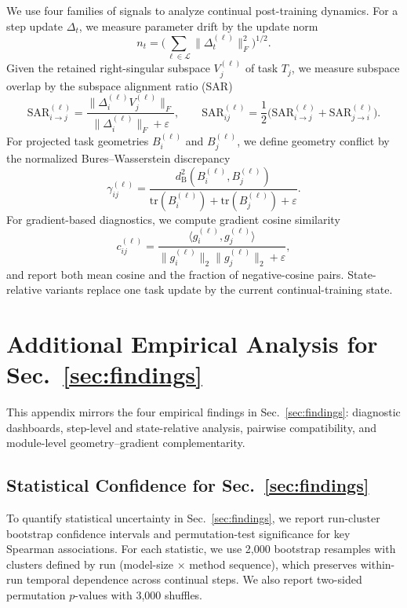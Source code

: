 \documentclass{article}
\begin{document}
We use four families of signals to analyze continual post-training dynamics.
For a step update \(\Delta_t\), we measure parameter drift by the update norm
\[
n_t=\Big(\sum_{\ell\in\mathcal{L}}\|\Delta_t^{(\ell)}\|_F^2\Big)^{1/2}.
\]
Given the retained right-singular subspace \(V_j^{(\ell)}\) of task \(T_j\), we measure subspace overlap by the subspace alignment ratio (SAR)
\[
\mathrm{SAR}_{i\rightarrow j}^{(\ell)}
=
\frac{\|\Delta_i^{(\ell)}V_j^{(\ell)}\|_F}
{\|\Delta_i^{(\ell)}\|_F+\varepsilon},
\qquad
\mathrm{SAR}_{ij}^{(\ell)}
=
\frac{1}{2}
\big(
\mathrm{SAR}_{i\rightarrow j}^{(\ell)}
+
\mathrm{SAR}_{j\rightarrow i}^{(\ell)}
\big).
\]
For projected task geometries \(B_i^{(\ell)}\) and \(B_j^{(\ell)}\), we define geometry conflict by the normalized Bures--Wasserstein discrepancy
\[
\gamma_{ij}^{(\ell)}
=
\frac{
d_{\mathrm{B}}^2(B_i^{(\ell)},B_j^{(\ell)})
}{
\mathrm{tr}(B_i^{(\ell)})+\mathrm{tr}(B_j^{(\ell)})+\varepsilon
}.
\]
For gradient-based diagnostics, we compute gradient cosine similarity
\[
c_{ij}^{(\ell)}
=
\frac{\langle g_i^{(\ell)},g_j^{(\ell)}\rangle}
{\|g_i^{(\ell)}\|_2\|g_j^{(\ell)}\|_2+\varepsilon},
\]
and report both mean cosine and the fraction of negative-cosine pairs.
State-relative variants replace one task update by the current continual-training state.



\FloatBarrier
\section{Additional Empirical Analysis for Sec.~\ref{sec:findings}}
\label{app:sec3_additional}

This appendix mirrors the four empirical findings in Sec.~\ref{sec:findings}: diagnostic dashboards, step-level and state-relative analysis, pairwise compatibility, and module-level geometry--gradient complementarity.

\subsection{Statistical Confidence for Sec.~\ref{sec:findings}}
\label{app:sec3_confidence}

To quantify statistical uncertainty in Sec.~\ref{sec:findings}, we report run-cluster bootstrap confidence intervals and permutation-test significance for key Spearman associations.
For each statistic, we use 2{,}000 bootstrap resamples with clusters defined by run (model-size \(\times\) method sequence), which preserves within-run temporal dependence across continual steps.
We also report two-sided permutation \(p\)-values with 3{,}000 shuffles.
\end{document}
